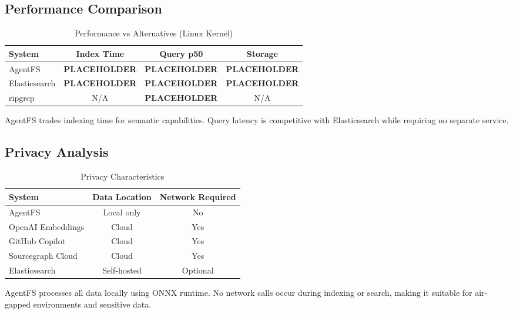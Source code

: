 \documentclass[conference]{IEEEtran}
\begin{document}
\subsection{Performance Comparison}

\begin{table}[htbp]
\caption{Performance vs Alternatives (Linux Kernel)}
\begin{center}
\begin{tabular}{lccc}
\toprule
\textbf{System} & \textbf{Index Time} & \textbf{Query p50} & \textbf{Storage} \\
\midrule
AgentFS & \textbf{PLACEHOLDER} & \textbf{PLACEHOLDER} & \textbf{PLACEHOLDER} \\
Elasticsearch & \textbf{PLACEHOLDER} & \textbf{PLACEHOLDER} & \textbf{PLACEHOLDER} \\
ripgrep & N/A & \textbf{PLACEHOLDER} & N/A \\
\bottomrule
\end{tabular}
\label{tab:perf_compare}
\end{center}
\end{table}

AgentFS trades indexing time for semantic capabilities. Query latency is competitive with Elasticsearch while requiring no separate service.

\subsection{Privacy Analysis}

\begin{table}[htbp]
\caption{Privacy Characteristics}
\begin{center}
\begin{tabular}{lcc}
\toprule
\textbf{System} & \textbf{Data Location} & \textbf{Network Required} \\
\midrule
AgentFS & Local only & No \\
OpenAI Embeddings & Cloud & Yes \\
GitHub Copilot & Cloud & Yes \\
Sourcegraph Cloud & Cloud & Yes \\
Elasticsearch & Self-hosted & Optional \\
\bottomrule
\end{tabular}
\label{tab:privacy}
\end{center}
\end{table}

AgentFS processes all data locally using ONNX runtime. No network calls occur during indexing or search, making it suitable for air-gapped environments and sensitive data.
\end{document}
